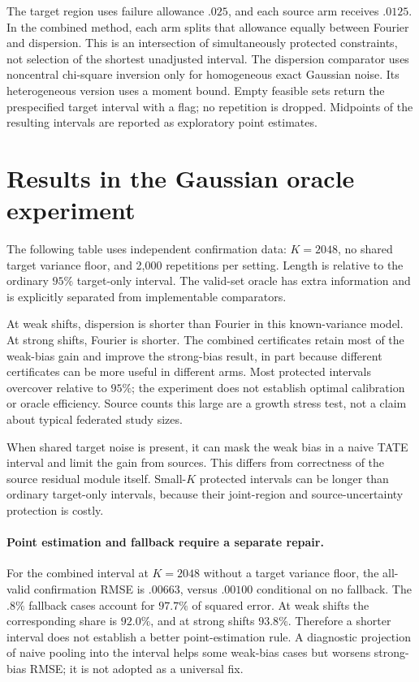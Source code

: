 \documentclass[11pt]{article}
\begin{document}
The target region uses failure allowance $.025$, and each source arm receives
$.0125$. In the combined method, each arm splits that allowance equally
between Fourier and dispersion. This is an intersection of simultaneously
protected constraints, not selection of the shortest unadjusted interval.
The dispersion comparator uses noncentral chi-square inversion only for
homogeneous exact Gaussian noise. Its heterogeneous version uses a moment
bound. Empty feasible sets return the prespecified target interval with a
flag; no repetition is dropped. Midpoints of the resulting intervals are
reported as exploratory point estimates.

\section{Results in the Gaussian oracle experiment}

The following table uses independent confirmation data: $K=2048$, no shared
target variance floor, and 2,000 repetitions per setting. Length is relative
to the ordinary $95\%$ target-only interval. The valid-set oracle has extra
information and is explicitly separated from implementable comparators.

\begin{center}\small

\end{center}

At weak shifts, dispersion is shorter than Fourier in this known-variance
model. At strong shifts, Fourier is shorter. The combined certificates retain
most of the weak-bias gain and improve the strong-bias result, in part because
different certificates can be more useful in different arms. Most protected
intervals overcover relative to $95\%$; the experiment does not establish
optimal calibration or oracle efficiency. Source counts this large are a
growth stress test, not a claim about typical federated study sizes.

When shared target noise is present, it can mask the weak bias in a naive
TATE interval and limit the gain from sources. This differs from correctness
of the source residual module itself. Small-$K$ protected intervals can be
longer than ordinary target-only intervals, because their joint-region and
source-uncertainty protection is costly.

\paragraph{Point estimation and fallback require a separate repair.}
For the combined interval at $K=2048$ without a target variance floor,
the all-valid confirmation RMSE is $.00663$, versus $.00100$ conditional
on no fallback. The $.8\%$ fallback cases account for $97.7\%$ of squared
error. At weak shifts the corresponding share is $92.0\%$, and at strong
shifts $93.8\%$. Therefore a shorter interval does not establish a better
point-estimation rule. A diagnostic projection of naive pooling into the
interval helps some weak-bias cases but worsens strong-bias RMSE; it is not
adopted as a universal fix.
\end{document}

